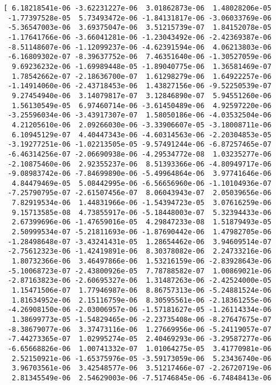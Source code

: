 \documentclass[11pt]{article}
\begin{document}
    \begin{Verbatim}[commandchars=\\\{\}]
[ 6.18218541e-06 -3.62231227e-06  3.01862873e-06  1.48028206e-05
 -1.77397528e-05  5.73493472e-06 -1.84131817e-06 -3.06033769e-06
 -5.36547003e-06  3.69375047e-06  3.51215739e-07  1.84152078e-05
 -1.17641766e-06 -3.66041281e-06 -1.23043492e-06 -2.42369387e-06
 -8.51148607e-06 -1.12099237e-06 -4.62391594e-06  4.06213803e-06
 -6.16809302e-07 -8.39637752e-06  7.46351640e-06 -1.30527059e-06
  9.69236232e-06 -1.69989448e-05 -1.89040775e-06  1.36581469e-07
  1.78542662e-07 -2.18636700e-07  1.61298279e-06  1.64922257e-06
 -1.14914060e-06 -2.43718453e-06  1.43827156e-06 -9.52250539e-07
  9.27454940e-06  3.14079817e-07  3.12846890e-07  5.94551260e-06
  1.56130549e-05  6.97460714e-06 -3.61450489e-06  4.92597220e-06
 -3.25596034e-06 -3.43917307e-07  1.58050186e-06 -4.03532504e-06
  4.21205610e-06  2.09266030e-06 -3.33906607e-05 -3.18008711e-06
  6.10945129e-07  4.40447343e-06 -4.60314563e-06 -2.20304853e-05
 -3.19277251e-06 -1.02213505e-05 -9.57491244e-06 -6.87257465e-07
 -6.46314256e-07 -2.06690938e-06 -4.29534772e-08  1.03235277e-06
 -2.10875460e-06  2.92355237e-06  8.51393366e-06 -4.80949717e-06
 -9.08983742e-06 -7.84699890e-06 -5.49964864e-06  3.97741646e-06
  4.84479469e-05  5.08442995e-06 -6.56656960e-06 -1.10104936e-07
 -7.25790795e-07 -2.61507456e-07  8.06043943e-07  2.05039656e-06
  7.82919534e-06  1.44831966e-06 -1.54394723e-05  3.07616259e-06
  9.15713585e-08  4.73855917e-06 -5.18448003e-07  5.32394433e-06
  2.67399696e-06 -1.47659016e-05  4.29847233e-08  1.51879493e-05
  2.50999534e-07 -5.21811693e-06 -1.87690442e-06  1.47982705e-06
 -1.28498648e-07 -3.43241431e-05  1.28654462e-06  3.94609514e-07
 -2.75612323e-06 -1.42419891e-06  8.30378082e-06  2.24733216e-06
  1.80732366e-06  3.46497866e-06  1.53216159e-06 -2.83928643e-06
 -5.10068723e-07 -2.43800926e-05  7.78788582e-07  1.00869021e-06
 -2.87163823e-06 -2.60695327e-06  1.31487263e-06 -2.42524000e-05
  1.15471506e-07  1.77946987e-06  8.86757313e-06 -5.24881524e-06
  1.81634952e-06  2.15116759e-06  8.30595561e-06 -2.18361255e-06
 -4.26908150e-06 -2.03006957e-06 -1.57181627e-05 -1.26114334e-06
  1.38699773e-05 -1.54829465e-06 -2.23735408e-06 -8.27647675e-07
 -8.38679077e-06  3.37473116e-06  1.27669956e-06 -5.24119057e-07
 -7.44273365e-07  1.02995274e-05  2.40469293e-06 -3.29587277e-06
 -6.65668826e-06  1.00741332e-07  1.01064275e-05  3.41770981e-06
  2.52150921e-06 -1.65375976e-05 -3.59173059e-06  5.23436740e-06
  3.96703561e-06  3.42548577e-06  3.51217466e-07 -2.26720719e-06
  2.81345549e-06  2.54629003e-06 -7.51746845e-06 -6.74848413e-06

\end{Verbatim}
\end{document}
